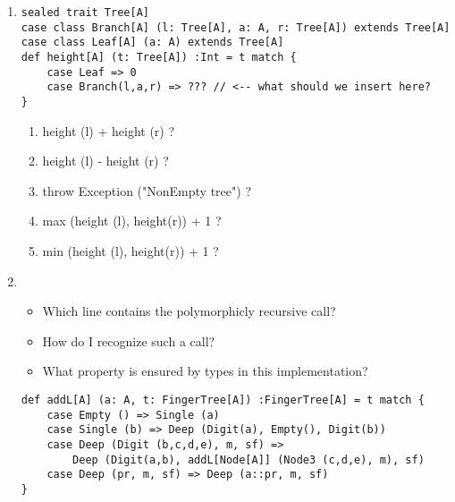 \begin{enumerate}
    \item 
    \begin{verbatim}
sealed trait Tree[A]
case class Branch[A] (l: Tree[A], a: A, r: Tree[A]) extends Tree[A]
case class Leaf[A] (a: A) extends Tree[A]
def height[A] (t: Tree[A]) :Int = t match {
    case Leaf => 0
    case Branch(l,a,r) => ??? // <-- what should we insert here?
} 
    \end{verbatim}
    
    \begin{enumerate}
        \item height (l) + height (r) ?
        \item height (l) - height (r) ?
        \item throw Exception ("NonEmpty tree") ?
        \item max (height (l), height(r)) + 1 ?
        \item min (height (l), height(r)) + 1 ?
    \end{enumerate}
    
    
    \item 
    \begin{itemize}
        \item Which line contains the polymorphicly recursive call?
        \item How do I recognize such a call?
        \item What property is ensured by types in this implementation?
    \end{itemize}
    
    \begin{verbatim}
def addL[A] (a: A, t: FingerTree[A]) :FingerTree[A] = t match {
    case Empty () => Single (a)
    case Single (b) => Deep (Digit(a), Empty(), Digit(b))
    case Deep (Digit (b,c,d,e), m, sf) =>
        Deep (Digit(a,b), addL[Node[A]] (Node3 (c,d,e), m), sf)
    case Deep (pr, m, sf) => Deep (a::pr, m, sf)
}
    \end{verbatim}
    
\end{enumerate}
















































